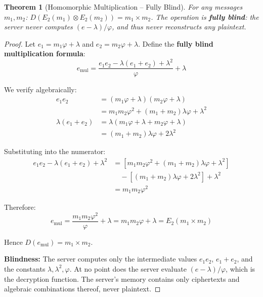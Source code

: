 \documentclass{article}
\newtheorem{theorem}{Theorem}[section]
\begin{document}
\begin{theorem}[Homomorphic Multiplication -- Fully Blind]
For any messages $m_1, m_2$: $D(E_2(m_1) \otimes E_2(m_2)) = m_1 \times m_2$. The operation is \textbf{fully blind}: the server never computes $(e - \lambda)/\varphi$, and thus never reconstructs any plaintext.
\end{theorem}

\begin{proof}
Let $e_1 = m_1\varphi + \lambda$ and $e_2 = m_2\varphi + \lambda$. Define the \textbf{fully blind multiplication formula}:
\begin{equation}
e_{\text{mul}} = \frac{e_1 e_2 - \lambda(e_1 + e_2) + \lambda^2}{\varphi} + \lambda
\end{equation}

We verify algebraically:
\begin{align}
e_1 e_2 &= (m_1\varphi + \lambda)(m_2\varphi + \lambda) \nonumber\\
&= m_1 m_2 \varphi^2 + (m_1 + m_2)\lambda\varphi + \lambda^2 \\
\lambda(e_1 + e_2) &= \lambda(m_1\varphi + \lambda + m_2\varphi + \lambda) \nonumber\\
&= (m_1 + m_2)\lambda\varphi + 2\lambda^2
\end{align}

Substituting into the numerator:
\begin{align}
e_1 e_2 - \lambda(e_1 + e_2) + \lambda^2 &= [m_1 m_2 \varphi^2 + (m_1+m_2)\lambda\varphi + \lambda^2] \nonumber\\
&\quad - [(m_1+m_2)\lambda\varphi + 2\lambda^2] + \lambda^2 \nonumber\\
&= m_1 m_2 \varphi^2
\end{align}

Therefore:
\begin{equation}
e_{\text{mul}} = \frac{m_1 m_2 \varphi^2}{\varphi} + \lambda = m_1 m_2 \varphi + \lambda = E_2(m_1 \times m_2)
\end{equation}

Hence $D(e_{\text{mul}}) = m_1 \times m_2$.

\textbf{Blindness:} The server computes only the intermediate values $e_1 e_2$, $e_1 + e_2$, and the constants $\lambda, \lambda^2, \varphi$. At no point does the server evaluate $(e - \lambda)/\varphi$, which is the decryption function. The server's memory contains only ciphertexts and algebraic combinations thereof, never plaintext.
\end{proof}
\end{document}
